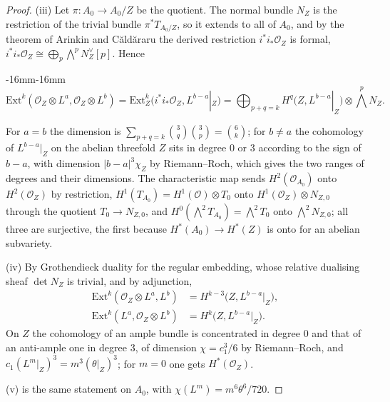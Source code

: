 \documentclass[11pt,reqno]{amsart}
\newenvironment{widetext}{\begin{adjustwidth}{-16mm}{-16mm}}{\end{adjustwidth}}
\numberwithin{equation}{section}
\theoremstyle{plain}
\theoremstyle{definition}
\newcommand{\Ext}{\mathrm{Ext}}
\begin{document}
\begin{proof}
(iii) Let $\pi\colon A_{0}\to A_{0}/Z$ be the quotient. The normal bundle $N_{Z}$ is the restriction of the trivial bundle $\pi^{*}T_{A_{0}/Z}$, so it extends to all of $A_{0}$, and by the theorem of Arinkin and C\u{a}ld\u{a}raru \cite{AC12} the derived restriction $i^{*}i_{*}\mathcal{O}_{Z}$ is formal, $i^{*}i_{*}\mathcal{O}_{Z}\cong\bigoplus_{p}\bigwedge^{p}N_{Z}^{\vee}[p]$. Hence
\begin{widetext}
\begin{equation}\label{eq:cmextz}
\Ext^{k}(\mathcal{O}_{Z}\otimes L^{a},\mathcal{O}_{Z}\otimes L^{b})=\Ext^{k}_{Z}\bigl(i^{*}i_{*}\mathcal{O}_{Z},L^{b-a}|_{Z}\bigr)=\bigoplus_{p+q=k}H^{q}\bigl(Z,L^{b-a}|_{Z}\bigr)\otimes\textstyle\bigwedge^{p}N_{Z}.
\end{equation}
\end{widetext}
For $a=b$ the dimension is $\sum_{p+q=k}\binom{3}{q}\binom{3}{p}=\binom{6}{k}$; for $b\ne a$ the cohomology of $L^{b-a}|_{Z}$ on the abelian threefold $Z$ sits in degree $0$ or $3$ according to the sign of $b-a$, with dimension $|b-a|^{3}\chi_{Z}$ by Riemann--Roch, which gives the two ranges of degrees and their dimensions. The characteristic map sends $H^{2}(\mathcal{O}_{A_{0}})$ onto $H^{2}(\mathcal{O}_{Z})$ by restriction, $H^{1}(T_{A_{0}})=H^{1}(\mathcal{O})\otimes T_{0}$ onto $H^{1}(\mathcal{O}_{Z})\otimes N_{Z,0}$ through the quotient $T_{0}\to N_{Z,0}$, and $H^{0}(\bigwedge^{2}T_{A_{0}})=\bigwedge^{2}T_{0}$ onto $\bigwedge^{2}N_{Z,0}$; all three are surjective, the first because $H^{*}(A_{0})\to H^{*}(Z)$ is onto for an abelian subvariety.

(iv) By Grothendieck duality for the regular embedding, whose relative dualising sheaf $\det N_{Z}$ is trivial, and by adjunction,
\begin{align*}
\Ext^{k}(\mathcal{O}_{Z}\otimes L^{a},L^{b})&=H^{k-3}\bigl(Z,L^{b-a}|_{Z}\bigr),\\
\Ext^{k}(L^{a},\mathcal{O}_{Z}\otimes L^{b})&=H^{k}\bigl(Z,L^{b-a}|_{Z}\bigr).
\end{align*}
On $Z$ the cohomology of an ample bundle is concentrated in degree $0$ and that of an anti-ample one in degree $3$, of dimension $\chi=c_{1}^{3}/6$ by Riemann--Roch, and $c_{1}(L^{m}|_{Z})^{3}=m^{3}(\theta|_{Z})^{3}$; for $m=0$ one gets $H^{*}(\mathcal{O}_{Z})$.

(v) is the same statement on $A_{0}$, with $\chi(L^{m})=m^{6}\theta^{6}/720$.
\end{proof}
\end{document}
